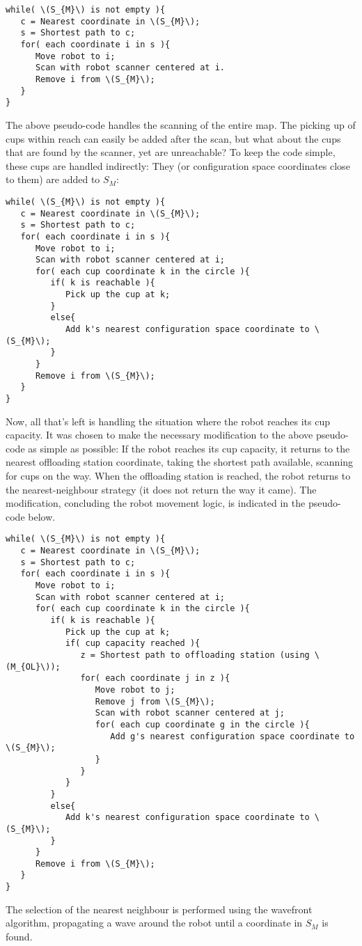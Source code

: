 \begin{verbatim}
while( \(S_{M}\) is not empty ){
   c = Nearest coordinate in \(S_{M}\);
   s = Shortest path to c;
   for( each coordinate i in s ){
      Move robot to i;
      Scan with robot scanner centered at i.
      Remove i from \(S_{M}\);
   }
}
\end{verbatim}

The above pseudo-code handles the scanning of the entire map.
The picking up of cups within reach can easily be added after the scan,
but what about the cups that are found by the scanner, yet are unreachable?
To keep the code simple, these cups are handled indirectly: They (or configuration space coordinates close to them) are added to \(S_{M}\):

\begin{verbatim}
while( \(S_{M}\) is not empty ){
   c = Nearest coordinate in \(S_{M}\);
   s = Shortest path to c;
   for( each coordinate i in s ){
      Move robot to i;
      Scan with robot scanner centered at i;
      for( each cup coordinate k in the circle ){
         if( k is reachable ){
            Pick up the cup at k;
         }
         else{
            Add k's nearest configuration space coordinate to \(S_{M}\);
         }
      }
      Remove i from \(S_{M}\);
   }
}
\end{verbatim}

Now, all that's left is handling the situation where the robot reaches its cup capacity.
It was chosen to make the necessary modification to the above pseudo-code as simple as possible:
If the robot reaches its cup capacity, it returns to the nearest offloading station coordinate,
taking the shortest path available, scanning for cups on the way. When the offloading station is reached,
the robot returns to the nearest-neighbour strategy (it does not return the way it came).
The modification, concluding the robot movement logic, is indicated in the pseudo-code below.

\begin{verbatim}
while( \(S_{M}\) is not empty ){
   c = Nearest coordinate in \(S_{M}\);
   s = Shortest path to c;
   for( each coordinate i in s ){
      Move robot to i;
      Scan with robot scanner centered at i;
      for( each cup coordinate k in the circle ){
         if( k is reachable ){
            Pick up the cup at k;
            if( cup capacity reached ){
               z = Shortest path to offloading station (using \(M_{OL}\));
               for( each coordinate j in z ){
                  Move robot to j;
                  Remove j from \(S_{M}\);
                  Scan with robot scanner centered at j;
                  for( each cup coordinate g in the circle ){
                     Add g's nearest configuration space coordinate to \(S_{M}\);
                  }
               }
            }
         }
         else{
            Add k's nearest configuration space coordinate to \(S_{M}\);
         }
      }
      Remove i from \(S_{M}\);
   }
}
\end{verbatim}

The selection of the nearest neighbour is performed using the wavefront algorithm, propagating
a wave around the robot until a coordinate in \(S_{M}\) is found.

